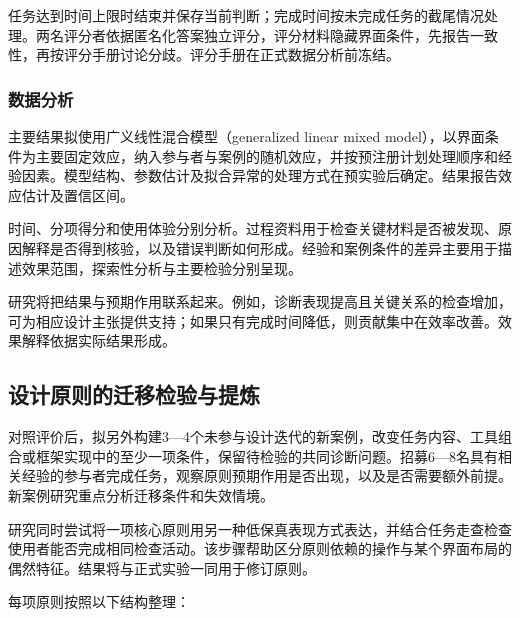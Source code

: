 任务达到时间上限时结束并保存当前判断；完成时间按未完成任务的截尾情况处理。两名评分者依据匿名化答案独立评分，评分材料隐藏界面条件，先报告一致性，再按评分手册讨论分歧。评分手册在正式数据分析前冻结。

\subsubsection{数据分析}

主要结果拟使用广义线性混合模型（generalized linear mixed model），以界面条件为主要固定效应，纳入参与者与案例的随机效应，并按预注册计划处理顺序和经验因素。模型结构、参数估计及拟合异常的处理方式在预实验后确定。结果报告效应估计及置信区间。

时间、分项得分和使用体验分别分析。过程资料用于检查关键材料是否被发现、原因解释是否得到核验，以及错误判断如何形成。经验和案例条件的差异主要用于描述效果范围，探索性分析与主要检验分别呈现。

研究将把结果与预期作用联系起来。例如，诊断表现提高且关键关系的检查增加，可为相应设计主张提供支持；如果只有完成时间降低，则贡献集中在效率改善。效果解释依据实际结果形成。

\subsection{设计原则的迁移检验与提炼}

对照评价后，拟另外构建3—4个未参与设计迭代的新案例，改变任务内容、工具组合或框架实现中的至少一项条件，保留待检验的共同诊断问题。招募6—8名具有相关经验的参与者完成任务，观察原则预期作用是否出现，以及是否需要额外前提。新案例研究重点分析迁移条件和失效情境。

研究同时尝试将一项核心原则用另一种低保真表现方式表达，并结合任务走查检查使用者能否完成相同检查活动。该步骤帮助区分原则依赖的操作与某个界面布局的偶然特征。结果将与正式实验一同用于修订原则。

每项原则按照以下结构整理：

